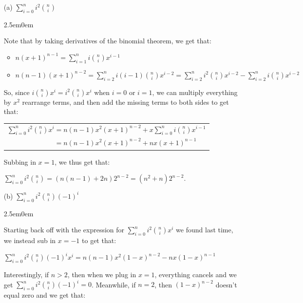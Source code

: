 \documentclass{book}
\newcommand{\exOne}{%
   \color{Purple}%
   \fontsize{13}{15}\selectfont%
}
\newcommand{\exTwo}{%
   \color{Purple}%
   \fontsize{13}{15}\selectfont%
}
\newenvironment{myIndent}{%
   \begin{adjustwidth}{2.5em}{0em}%
}{%
   \end{adjustwidth}%
}
\newcommand{\retTwo}{\hfill\bigbreak}
\begin{document}
\begin{enumerate}
   \item[(a)] $\sum\limits_{i=0}^n i^2\binom{n}{i}$
   
   \begin{myIndent}\exOne
      Note that by taking derivatives of the binomial theorem, we get that:\\ [-18pt]
      {\exTwo\begin{itemize}
         \item $n(x+1)^{n-1} = \sum\limits_{i=1}^{n} i\binom{n}{i}x^{i-1}$
         \item $ n(n-1)(x+1)^{n-2} = \sum\limits_{i=2}^{n} i(i-1)\binom{n}{i} x^{i-2} = \sum\limits_{i=2}^ni^2\binom{n}{i}x^{i-2} - \sum\limits_{i=2}^ni\binom{n}{i}x^{i-2}$\retTwo
      \end{itemize}}

      So, since $i\binom{n}{i}x^{i} = i^2\binom{n}{i}x^{i}$ when $i = 0$ or $i = 1$, we can multiply everything by $x^2$ rearrange terms, and then add the missing terms to both sides to get that:
      
      {\centering 
      \begin{tabular}{l}
         $\sum\limits_{i=0}^n i^2\binom{n}{i}x^i = n(n-1)x^2(x+1)^{n-2} + x\sum\limits_{i=0}^n i\binom{n}{i}x^{i-1}$\\ $\phantom{\sum\limits_{i=0}^n i^2\binom{n}{i}x^i}= n(n-1)x^2(x+1)^{n-2} + nx(x+1)^{n-1}$
      \end{tabular}\retTwo\par}

      Subbing in $x = 1$, we thus get that:
      
      {\centering $\sum\limits_{i=0}^n i^2\binom{n}{i} = (n(n-1) + 2n)2^{n-2} = (n^2 + n)2^{n-2}$.\retTwo\par}
   \end{myIndent}

   \item[(b)] $\sum\limits_{i=0}^n i^2\binom{n}{i}(-1)^i$
   
   \begin{myIndent}\exOne
      Starting back off with the expression for $\sum\limits_{i=0}^n i^2\binom{n}{i}x^i$ we found last time, we instead sub in $x = -1$ to get that:

      {\centering $\sum\limits_{i=0}^n i^2\binom{n}{i}(-1)^ix^i = n(n-1)x^2(1-x)^{n-2} - nx(1-x)^{n-1}$ \retTwo\par}



      Interestingly, if $n > 2$, then when we plug in $x = 1$, everything cancels and we get $\sum\limits_{i=0}^n i^2\binom{n}{i}(-1)^i = 0$. Meanwhile, if $n = 2$, then $(1 - x)^{n-2}$ doesn't equal zero and we get that:


\end{myIndent}
\end{enumerate}
\end{document}
